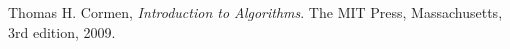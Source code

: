\documentclass[a4paper, 11pt]{article}
\begin{document}
\pagestyle{myheadings}
\maketitle

\thispagestyle{empty}
\tableofcontents

\newpage






\newpage

\newpage
\begin{thebibliography}{11}

  Thomas H. Cormen,
  \emph{Introduction to Algorithms}.
  The MIT Press, Massachusetts,
  3rd edition,
  2009.

\end{thebibliography}
%
%
\end{document}
